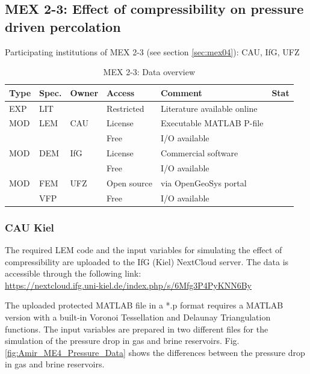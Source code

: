 \subsection{MEX 2-3: Effect of compressibility on pressure driven percolation}

Participating institutions of MEX 2-3 (see section \ref{sec:mex04}): CAU, IfG, UFZ

\begin{table}[ht!]
\caption{MEX 2-3: Data overview}
\label{tab:dms-mex23-overview}
\small
\begin{tabular}{l|l|l|l|L{4.7cm}|l}
\hline
{}
Type & Spec. & Owner & Access     & Comment                       & Stat \\ 
\hline 
EXP  & LIT   & \cite{Kamlot2009} & Restricted & Literature available online &  \\
\hline \hline
MOD  & LEM   & CAU   & License    & Executable MATLAB P-file      &  \\
     &       &       & Free       & I/O available                 &  \\
\hline
MOD  & DEM   & IfG   & License    & Commercial software           &  \\
     &       &       & Free       & I/O available                 &  \\
\hline
MOD  & FEM   & UFZ   & Open source & via OpenGeoSys portal        &  \\
     & VFP   &       & Free        & I/O available                &  \\
%
\hline
\end{tabular}
\end{table}
\normalsize

\subsubsection*{CAU Kiel}

The required LEM code and the input variables for simulating the effect of compressibility are uploaded to the IfG (Kiel) NextCloud server. The data is accessible through the following link:\\
\url{https://nextcloud.ifg.uni-kiel.de/index.php/s/6Mfg3P4PyKNN6By}

The uploaded protected MATLAB file in a *.p format requires a MATLAB version with a built-in Voronoi Tessellation and Delaunay Triangulation functions. The input variables are prepared in two different files for the simulation of the pressure drop in gas and brine reservoirs. Fig. \ref{fig:Amir_ME4_Pressure_Data} shows the differences between the pressure drop in gas and brine reservoirs.

